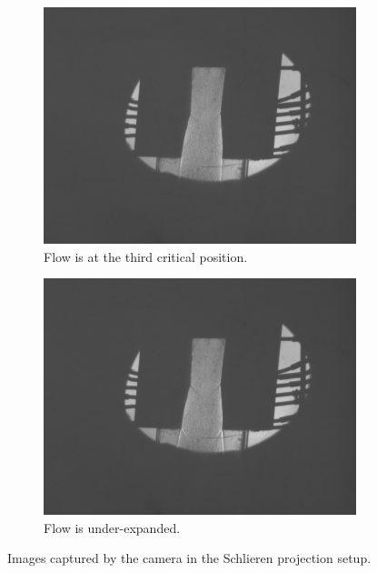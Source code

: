 \begin{figure}[htpb]
\begin{subfigure}{0.49\textwidth}
        \centering
        \includegraphics[width=\textwidth]{Figures/2-3rd_critical_condition.tiff}
        \caption{Flow is at the third critical position.}
        \label{fig:schlieren_third_critical}
    \end{subfigure}
    \begin{subfigure}{0.49\textwidth}
        \centering
        \includegraphics[width=\textwidth]{Figures/1-under-expanded_flow.tiff}
        \caption{Flow is under-expanded.}
        \label{fig:schlieren_under-expanded}
    \end{subfigure}
    \caption{Images captured by the camera in the Schlieren projection setup.}
    \label{fig:schlieren_image_captures}
\end{figure}